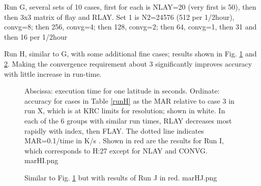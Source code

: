 \documentclass{article}
\begin{document}
\clearpage
Run G, several sets of 10 cases, first for each is NLAY=20 (very first is 50),
then then 3x3 matrix of flay and RLAY. Set 1 is N2=24576 (512 per 1/2hour),
convg=8; then 256, convg=4; then 128, convg=2; then 64, convg=1, then 31 and
then 16 per 1/2hour

Run H, similar to G, with some additional fine cases; results shown in Fig. \ref{marHI} and  \ref{marHJ}. Making the convergence requirement about 3 significantly improves accuracy with little increase in run-time.

\begin{figure}[!ht] 
\caption[Accuracy versus time]{Abscissa: execution time for one latitude in
  seconds. Ordinate: accuracy for cases in Table \ref{runH} as the MAR relative to case 3 in run X, which is at KRC limits for resolution; shown in white.  In each of the 6 groups with similar run times, RLAY decreases most rapidly with index, then FLAY. The dotted line indicates MAR=0.1/time in K/s . Shown in red are the results for Run I, which corresponds to H:27 except for NLAY and CONVG. 
\label{marHI} marHI.png }
\end{figure} 

\begin{figure}[!ht] 
\caption[Accuracy versus shorter time]{ Similar to Fig. \ref{marHI} but with results of Run J in red.
\label{marHJ} marHJ.png }
\end{figure} 
\end{document}
